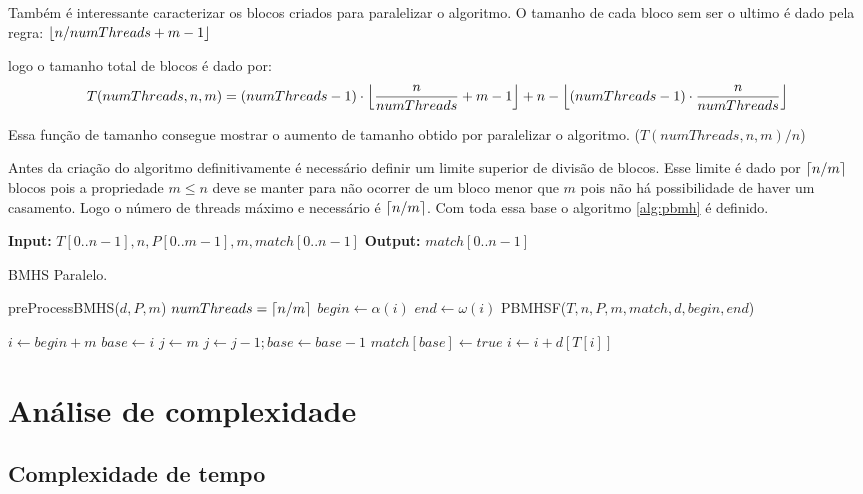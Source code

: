 \documentclass[11pt]{article}
\begin{document}
Também é interessante caracterizar os blocos criados para paralelizar o algoritmo. O tamanho de cada bloco sem ser o ultimo é dado pela regra: \(\floor{n/numThreads+m-1}\)

logo o tamanho total de blocos é dado por: 
\begin{equation}
T(numThreads,n,m) = (numThreads-1)\cdot \floor*{\frac{n}{numThreads}+m-1}+n-\floor*{(numThreads-1)\cdot \frac{n}{numThreads}}
\end{equation}

Essa função de tamanho consegue mostrar o aumento de tamanho obtido por paralelizar o algoritmo. (\(T(numThreads,n,m)/n\))

Antes da criação do algoritmo definitivamente é necessário definir um limite superior de divisão de blocos. Esse limite é dado por \(\ceil{n/m}\) blocos pois a propriedade \(m\leq n\) deve se manter para não ocorrer de um bloco menor que \(m\) pois não há possibilidade de haver um casamento. Logo o número de threads máximo e necessário é \(\ceil{n/m}\). Com toda essa base o algoritmo \ref{alg:pbmh} é definido.

\begin{algorithm}
\textbf{Input:} $T[0..n-1], n, P[0..m-1], m, match[0..n-1]$
\textbf{Output:} $match[0..n-1]$
\caption{BMHS Paralelo.}\label{alg:pbmh}
\begin{algorithmic}[1]
\State preProcessBMHS($d,P,m$)
\State $numThreads = \ceil{n/m}$
\EndIf
{}
\State $begin\gets \alpha(i)$
\State $end\gets \omega(i)$
\State PBMHSF($T,n,P,m,match,d,begin,end$)
\EndFor
\EndProcedure

\State $i\gets begin+m$
\State $base\gets i$
\State $j\gets m$
\State $j\gets j-1; base\gets base -1$
\EndWhile
{}
\State $match[base]\gets true$
\EndIf
{}
\State $i\gets i+d[T[i]]$
\Else
\State \Break
\EndIf
\EndWhile
\EndProcedure
\end{algorithmic}
\end{algorithm}

\section{Análise de complexidade}
\label{sec:org75518ad}
\subsection{Complexidade de tempo}
\label{sec:orgb3e1ea0}
\end{document}
